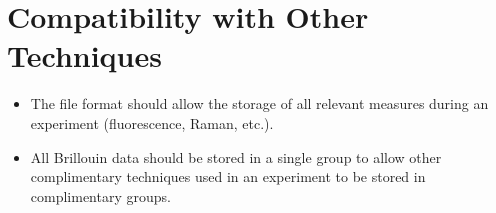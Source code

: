 \documentclass{article}
\begin{document}
\section{Compatibility with Other Techniques}
\begin{itemize}
    \item The file format should allow the storage of all relevant measures during an experiment (fluorescence, Raman, etc.).
    \item All Brillouin data should be stored in a single group to allow other complimentary techniques used in an experiment to be stored in complimentary groups.
\end{itemize}
\end{document}
